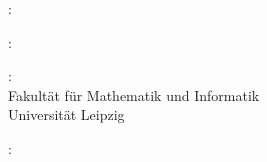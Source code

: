 \thispagestyle{empty}

\hfill

\vfill

\noindent{}: \\
\myName{} %

\medskip

\noindent{}: \\
\emph{\myTitle}

\medskip

\noindent{}: \\
Fakultät für Mathematik und Informatik \\
Universität Leipzig

\medskip

\noindent{}: \\
\myProf \\
\myOtherProf \\
\mySupervisor

\medskip

